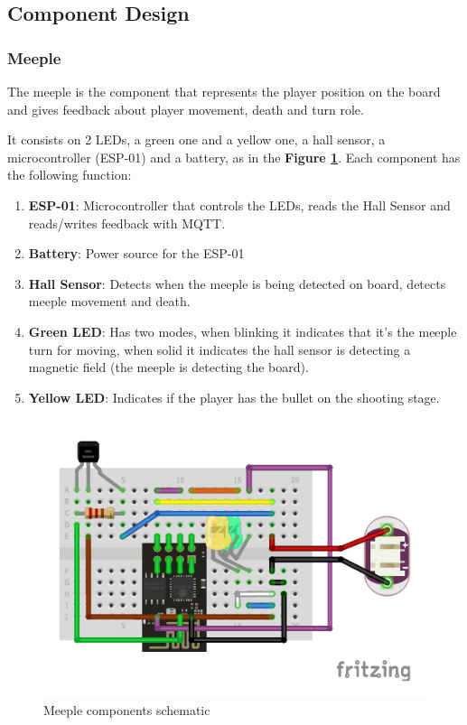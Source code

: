 \documentclass[../main.tex]{subfiles}
\begin{document}
\subsection{Component Design}

\subsubsection{Meeple}

The meeple is the component that represents the player position on the board and gives feedback about player movement, death and turn role.

It consists on 2 LEDs, a green one and a yellow one, a hall sensor, a microcontroller (ESP-01) and a battery, as in the \textbf{Figure \ref{fig:meeple}}. Each component has the following function:

\begin{enumerate}
    \item \textbf{ESP-01}: Microcontroller that controls the LEDs, reads the Hall Sensor and reads/writes feedback with MQTT.
    \item \textbf{Battery}: Power source for the ESP-01
    \item \textbf{Hall Sensor}: Detects when the meeple is being detected on board, detects meeple movement and death.
    \item \textbf{Green LED}: Has two modes, when blinking it indicates that it's the meeple turn for moving, when solid it indicates the hall sensor is detecting a magnetic field (the meeple is detecting the board).
    \item \textbf{Yellow LED}: Indicates if the player has the bullet on the shooting stage.
\end{enumerate}

\begin{figure}[!htb]
    \centering
    \includegraphics[width= 0.5\linewidth]{../media/figures/schematic_meeple.pdf}
    \caption{Meeple components schematic}
    \label{fig:meeple}
\end{figure}
\end{document}
